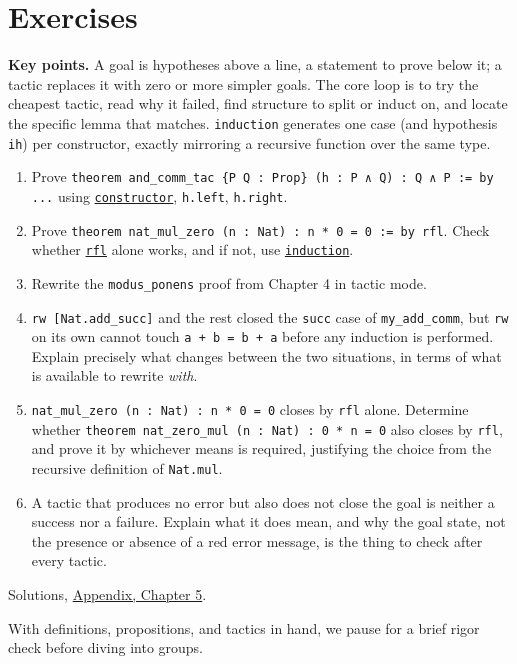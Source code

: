 \section{Exercises}\label{sec:05-tactics:06-exercises:1}

\textbf{Key points.} A goal is hypotheses above a line, a statement to prove below it; a tactic replaces it with zero or more simpler goals. The core loop is to try the cheapest tactic, read why it failed, find structure to split or induct on, and locate the specific lemma that matches. \texttt{induction} generates one case (and hypothesis \texttt{ih}) per constructor, exactly mirroring a recursive function over the same type.

\begin{enumerate}
\def\labelenumi{\arabic{enumi}.}
\tightlist
\item
  Prove \texttt{theorem and\_\allowbreak{}comm\_\allowbreak{}tac \{P Q : Prop\} (h : P ∧ Q) : Q ∧ P := by ...} using \href{https://lean-lang.org/doc/reference/latest/Tactic-Proofs/Tactic-Reference/}{\texttt{constructor}}, \texttt{h.left}, \texttt{h.right}.
\item
  Prove \texttt{theorem nat\_\allowbreak{}mul\_\allowbreak{}zero (n : Nat) : n * 0 = 0 := by rfl}. Check whether \href{https://lean-lang.org/doc/reference/latest/Tactic-Proofs/Tactic-Reference/}{\texttt{rfl}} alone works, and if not, use \href{https://lean-lang.org/doc/reference/latest/Tactic-Proofs/Tactic-Reference/}{\texttt{induction}}.
\item
  Rewrite the \texttt{modus\_\allowbreak{}ponens} proof from Chapter 4 in tactic mode.
\item
  \texttt{rw [Nat.add\_\allowbreak{}succ]} and the rest closed the \texttt{succ} case of \texttt{my\_\allowbreak{}add\_\allowbreak{}comm}, but \texttt{rw} on its own cannot touch \texttt{a + b = b + a} before any induction is performed. Explain precisely what changes between the two situations, in terms of what is available to rewrite \emph{with}.
\item
  \texttt{nat\_\allowbreak{}mul\_\allowbreak{}zero (n : Nat) : n * 0 = 0} closes by \texttt{rfl} alone. Determine whether \texttt{theorem nat\_\allowbreak{}zero\_\allowbreak{}mul (n : Nat) : 0 * n = 0} also closes by \texttt{rfl}, and prove it by whichever means is required, justifying the choice from the recursive definition of \texttt{Nat.mul}.
\item
  A tactic that produces no error but also does not close the goal is neither a success nor a failure. Explain what it does mean, and why the goal state, not the presence or absence of a red error message, is the thing to check after every tactic.
\end{enumerate}

Solutions, \hyperref[sec:15-appendix-solutions:05-chapter-5:1]{Appendix, Chapter 5}.

With definitions, propositions, and tactics in hand, we pause for a brief rigor check before diving into groups.
